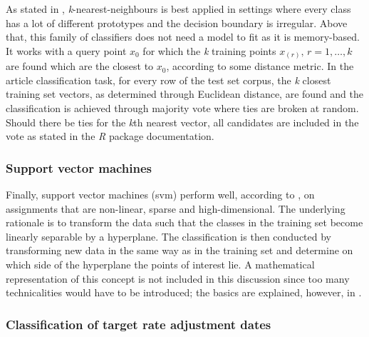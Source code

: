 As stated in \textcite[p.~465]{Friedman.2001}, \textit{k}-nearest-neighbours is best applied in settings where every class has a lot of different prototypes and the decision boundary is irregular. Above that, this family of classifiers does not need a model to fit as it is memory-based. It works with a query point $x_0$ for which the \textit{k} training points $x_{(r)},\, r=1,\dots,k$ are found which are the closest to $x_0$, according to some distance metric. In the article classification task, for every row of the test set corpus, the \textit{k} closest training set vectors, as determined through Euclidean distance, are found and the classification is achieved through majority vote where ties are broken at random. Should there be ties for the \textit{k}th nearest vector, all candidates are included in the vote as stated in the \textit{R} package documentation. 


\subsubsection{Support vector machines} %

Finally, support vector machines (svm) perform well, according to \textcite[p.~293]{Williams.2011}, on assignments that are non-linear, sparse and high-dimensional. The underlying rationale is to transform the data such that the classes in the training set become linearly separable by a hyperplane. The classification is then conducted by transforming new data in the same way as in the training set and determine on which side of the hyperplane the points of interest lie. A mathematical representation of this concept is not included in this discussion since too many technicalities would have to be introduced; the basics are explained, however, in \textcite[p.~417]{Friedman.2001}. 

%
\subsubsection{Classification of target rate adjustment dates}

